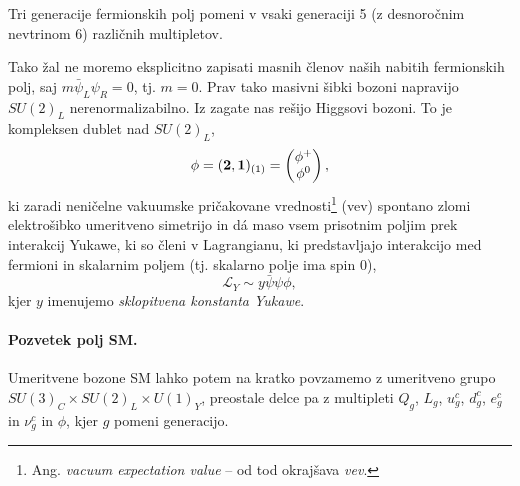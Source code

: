 Tri generacije fermionskih polj pomeni v vsaki generaciji 5 (z desnoročnim nevtrinom 6)
različnih multipletov. 

Tako žal ne moremo eksplicitno zapisati masnih členov naših nabitih fermionskih polj, saj
$m\bar{\psi}_L\psi_R = 0$, tj. $m = 0$. Prav tako masivni šibki bozoni napravijo $SU(2)_L$
nerenormalizabilno. Iz zagate nas rešijo Higgsovi bozoni. To je kompleksen dublet nad $SU(2)_L$,
\begin{equation}
	\phi = (\mathbf{2}, \mathbf{1})_{(1)} = \begin{pmatrix}
		\phi^+ \\
		\phi^0
	\end{pmatrix},
	\label{multipletiK}
\end{equation}
ki zaradi neničelne vakuumske pričakovane vrednosti\footnote{Ang. \emph{vacuum expectation value} -- od
tod okrajšava \emph{vev}.} (vev) spontano zlomi elektrošibko umeritveno simetrijo in dá maso vsem
prisotnim poljim prek interakcij Yukawe, ki so členi v Lagrangianu, ki predstavljajo interakcijo
med fermioni in skalarnim poljem (tj. skalarno polje ima spin 0),
\begin{equation}
	\mathcal{L}_Y \sim y\bar{\psi}\psi\phi,
\end{equation}
kjer $y$ imenujemo \emph{sklopitvena konstanta Yukawe}.

\paragraph{Pozvetek polj SM.}
Umeritvene bozone SM lahko potem na kratko povzamemo z umeritveno grupo $SU(3)_C\times SU(2)_L\times
U(1)_Y$, preostale delce pa z multipleti $Q_g$, $L_g$, $u^c_g$, $d^c_g$, $e^c_g$ in $\nu^c_g$ in $\phi$,
kjer $g$ pomeni generacijo.























